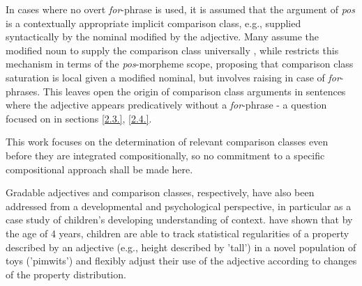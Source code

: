 In cases where no overt \textit{for}-phrase is used, it is assumed that the argument of \textit{pos} is a contextually appropriate implicit comparison class, e.g., supplied syntactically by the nominal modified by the adjective. Many assume the modified noun to supply the comparison class universally \parencite[cf. e.g. ][]{Cresswell1976, Kamp1975, Heim2000}, while \textcite{Solt2009} restricts this mechanism in terms of the \textit{pos}-morpheme scope, proposing that comparison class saturation is local given a modified nominal, but involves raising in case of \textit{for}-phrases. This leaves open the origin of comparison class arguments in sentences where the adjective appears predicatively without a \textit{for}-phrase - a question focused on in sections \ref{2.3.}, \ref{2.4.}. 

This work focuses on the determination of relevant comparison classes even before they are integrated compositionally, so no commitment to a specific compositional approach shall be made here. 

Gradable adjectives and comparison classes, respectively, have also been addressed from a developmental and psychological perspective, in particular as a case study of children's developing understanding of context. 
\textcite{barner2008} have shown that by the age of 4 years, children are able to track statistical regularities of a property described by an adjective (e.g., height described by 'tall') in a novel population of toys ('pimwits') and flexibly adjust their use of the adjective according to changes of the property distribution. 
 
